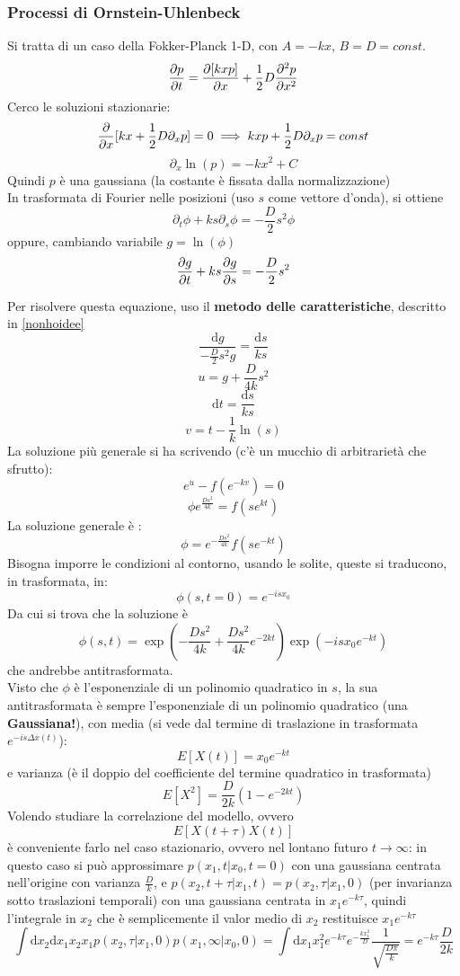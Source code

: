 \documentclass[a4paper,12pt]{article}
\theoremstyle{plain}
\theoremstyle{definition}
\newcommand{\f}[2]{\frac{#1}{#2}}
\newcommand{\tdv}{\partial_t}
\renewcommand{\d}{\text{d}}
\newcommand{\ra}{\rightarrow}
\theoremstyle{remark}
\begin{document}
\subsubsection{Processi di Ornstein-Uhlenbeck}\label{boh}
Si tratta di un caso della Fokker-Planck 1-D, con $A=-kx$, $B=D=const$.\\
\[\pdv{p}{t}=\pdv{[kxp]}{x}+\f{1}{2}D\pdv[2]{p}{x}\]	
Cerco le soluzioni stazionarie:
\[\pdv{x}[kx+\f{1}{2}D\partial_xp]=0\implies kxp+\f{1}{2}D\partial_xp=const\]
\[\partial_x\ln (p)	=-kx^2+C	\]
Quindi $p$ è una gaussiana (la costante è fissata dalla normalizzazione)
\\In trasformata di Fourier nelle posizioni (uso $s$ come vettore d'onda), si ottiene	\[\tdv \phi+ks\partial_s\phi=-\f{D}{2}s^2	\phi\]
oppure, cambiando variabile $g=\ln(\phi)$
\[\pdv{g}{t}+ks\pdv{g}{s}=-\f{D}{2}s^2	\]

Per risolvere questa equazione, uso il \textbf{metodo delle caratteristiche}, descritto in \ref{nonhoidee}
\[\f{\d g }{-\f{D}{2}s^2g}=\f{\d s}{k s}		\]
\[u=g	+\f{D}{4k} s^2	\]
\[{\d t }=\f{\d s}{k s}\]
\[v=t-\f{1}{k}\ln(s)\]
La soluzione più generale si ha scrivendo (c'è un mucchio di arbitrarietà che sfrutto):\[e^{u}-f(e^{-kv})=0\]
\[\phi e^{\f{Ds^2}{4k}}=f(se^{kt})	\]
La soluzione generale è :
\[\phi=e^{-\f{Ds^2}{4k}}f(se^{-kt})\]
Bisogna imporre le condizioni al contorno, usando le solite, queste si traducono, in trasformata, in:\[\phi(s,t=0)=e^{-isx_0}\]
Da cui si trova che la soluzione è
\[\phi(s,t)=  \exp(-\f{Ds^2}{4k}+\f{Ds^2}{4k}e^{-2kt})\exp(-i s x_0e^{-kt})\]
che andrebbe antitrasformata.\\Visto che $\phi$ è l'esponenziale di un polinomio quadratico in $s$, la sua antitrasformata è sempre l'esponenziale di un polinomio quadratico (una \textbf{Gaussiana!}), con media (si vede dal termine di traslazione in trasformata $e^{-is \Delta x(t)}$):
\[E[{X(t)}]=x_0e^{-kt}\]
e varianza (è il doppio del coefficiente del termine quadratico in trasformata)
\[E[X^2]=\f{D}{2k}\left(1-e^{-2kt}\right)\]
Volendo studiare la correlazione del modello, ovvero
\[E[X(t+\tau)X(t)]\]
è conveniente farlo nel caso stazionario, ovvero nel lontano futuro $t\ra \infty$: in questo caso si può approssimare $p(x_1,t|x_0,t=0)$ con una gaussiana centrata nell'origine con varianza $\f{D}{k}$, e  $p(x_2,t+\tau|x_1,t)=p(x_2,\tau|x_1,0)$ (per invarianza sotto traslazioni temporali) con una gaussiana centrata in  $x_1 e^{-k\tau}$, quindi l'integrale in $x_2$ che è semplicemente il valor medio di $x_2$ restituisce $x_1e^{-k\tau}$ 
\[\int \d x_2\d x_1 x_2x_1	p(x_2,\tau|x_1,0)p(x_1,\infty|x_0,0)= \int \d x_1 x_1^2 e^{-k\tau}	e^{-\f{kx_1^2}{D}}	\f{1}{\sqrt{\f{D\pi}{k}}}=e^{-k\tau}\f{D}{2k}\]
\end{document}
